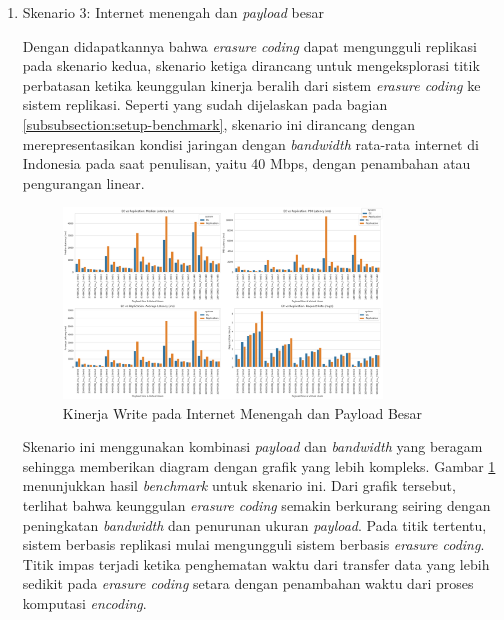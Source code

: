 \begin{enumerate}
  \item Skenario 3: Internet menengah dan \textit{payload} besar
  
  Dengan didapatkannya bahwa \textit{erasure coding} dapat mengungguli replikasi pada skenario kedua, skenario ketiga dirancang untuk mengeksplorasi titik perbatasan ketika keunggulan kinerja beralih dari sistem \textit{erasure coding} ke sistem replikasi. Seperti yang sudah dijelaskan pada bagian \ref{subsubsection:setup-benchmark}, skenario ini dirancang dengan merepresentasikan kondisi jaringan dengan \textit{bandwidth} rata-rata internet di Indonesia pada saat penulisan, yaitu 40 Mbps, dengan penambahan atau pengurangan linear.
  
  \begin{figure}[ht]
    \centering
    \includegraphics[width=0.8\textwidth]{resources/chapter-4/write_bigload_avgnet.png}

    \caption{Kinerja Write pada Internet Menengah dan Payload Besar}
    \label{fig:write-bigload-avgnet}
  \end{figure}

  Skenario ini menggunakan kombinasi \textit{payload} dan \textit{bandwidth} yang beragam sehingga memberikan diagram dengan grafik yang lebih kompleks. Gambar \ref{fig:write-bigload-avgnet} menunjukkan hasil \textit{benchmark} untuk skenario ini. Dari grafik tersebut, terlihat bahwa keunggulan \textit{erasure coding} semakin berkurang seiring dengan peningkatan \textit{bandwidth} dan penurunan ukuran \textit{payload}. Pada titik tertentu, sistem berbasis replikasi mulai mengungguli sistem berbasis \textit{erasure coding}. Titik impas terjadi ketika penghematan waktu dari transfer data yang lebih sedikit pada \textit{erasure coding} setara dengan penambahan waktu dari proses komputasi \textit{encoding}.


\end{enumerate}
